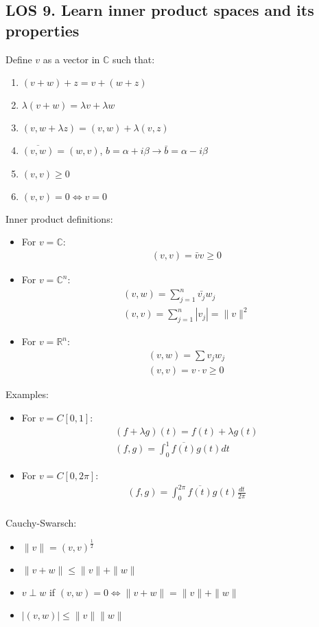 \documentclass[12pt, a4paper]{article}
\begin{document}
\subsection*{LOS 9. Learn inner product spaces and its properties}
Define $v$ as a vector in $\mathbb{C}$ such that:
\begin{enumerate}
    \item $(v+w) + z = v+(w+z)$
    \item $\lambda(v+w) = \lambda v + \lambda w$
    \item $(v, w+\lambda z) = (v, w) + \lambda (v, z)$
    \item $\overline{(v, w)} = (w, v)$, $b = \alpha + i\beta \rightarrow \bar{b} = \alpha - i\beta$
    \item $(v, v)\geq 0$
    \item $(v, v) = 0 \Longleftrightarrow v=0$\\
\end{enumerate}
Inner product definitions:
\begin{itemize}
    \item For $v = \mathbb{C}$:
    \begin{gather*}
        (v, v) = \bar{v}v \geq 0
    \end{gather*}
    \item For $v = \mathbb{C}^n$:
    \begin{gather*}
        (v, w) = \sum_{j=1}^n\bar{v_j}w_j\\
        (v, v) = \sum_{j=1}^n|v_j| = \|v\|^2
    \end{gather*}
    \item For $v = \mathbb{R}^n$:
    \begin{gather*}
        (v, w) = \sum v_jw_j\\
        (v, v) = v\cdot v \geq 0
    \end{gather*}
\end{itemize}
Examples:
\begin{itemize}
    \item For $v=C[0,1]$:
    \begin{gather*}
        (f+\lambda g)(t) = f(t) + \lambda g(t) \\
        (f, g) = \int_0^1\overline{f(t)}g(t)dt
    \end{gather*}
    \item For $v=C[0,2\pi]$:
    \begin{gather*}
        (f, g) = \int_0^{2\pi}\overline{f(t)}g(t)\frac{dt}{2\pi}\\
    \end{gather*}
\end{itemize}
Cauchy-Swarsch:
\begin{itemize}
    \item $\|v\| = (v, v)^{\frac{1}{2}}$
    \item $\|v+w\| \leq \|v\| + \|w\|$
    \item $v \perp w$ if $(v, w) = 0 \Leftrightarrow \|v+w\| = \|v\| + \|w\|$
    \item $|(v, w)| \leq \|v\|\|w\|$
\end{itemize}
\vspace{0.3em}
\end{document}
